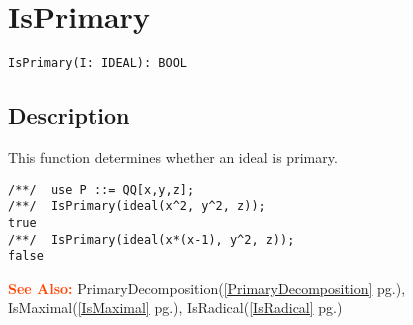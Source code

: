 \documentclass[a4paper]{mybook}
\newenvironment{command}{}{} %
\newcommand\SeeAlso{\par\textcolor{OrangeRed}{\textbf{\large See Also: }}}
\begin{document}
\section{IsPrimary}
\label{IsPrimary}
\begin{command} %


\begin{Verbatim}[label=syntax, rulecolor=\color{MidnightBlue},
frame=single]
IsPrimary(I: IDEAL): BOOL
\end{Verbatim}


\subsection*{Description}

This function determines whether an ideal is primary.
\begin{Verbatim}[label=example, rulecolor=\color{PineGreen}, frame=single]
/**/  use P ::= QQ[x,y,z];
/**/  IsPrimary(ideal(x^2, y^2, z));
true 
/**/  IsPrimary(ideal(x*(x-1), y^2, z));
false
\end{Verbatim}


\SeeAlso %
  PrimaryDecomposition(\ref{PrimaryDecomposition} pg.\pageref{PrimaryDecomposition}), 
    IsMaximal(\ref{IsMaximal} pg.\pageref{IsMaximal}), 
    IsRadical(\ref{IsRadical} pg.\pageref{IsRadical})
\end{command} %
\end{document}
